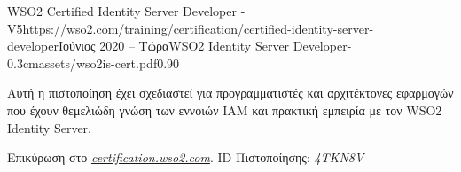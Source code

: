 \documentclass{mycv}
\begin{document}
	\vspace{0.75cm}
	
	\begin{EntryDatedLogo}{WSO2 Certified Identity Server
			Developer - V5}{https://wso2.com/training/certification/certified-identity-server-developer}{Ιούνιος 2020 -- Τώρα}{WSO2 Identity Server Developer}{-0.3cm}{assets/wso2is-cert.pdf}{0.90}
		\begin{Itemize}
			\item Αυτή η πιστοποίηση έχει σχεδιαστεί για προγραμματιστές και αρχιτέκτονες εφαρμογών που έχουν θεμελιώδη γνώση των εννοιών IAM και πρακτική εμπειρία με τον WSO2 Ιdentity Server. 
			\item Επικύρωση στο \href{https://certification.wso2.com}{\textit{certification.wso2.com}}. ID Πιστοποίησης: \textit{4TKN8V}
		\end{Itemize}
	\end{EntryDatedLogo}


	

\end{document}
